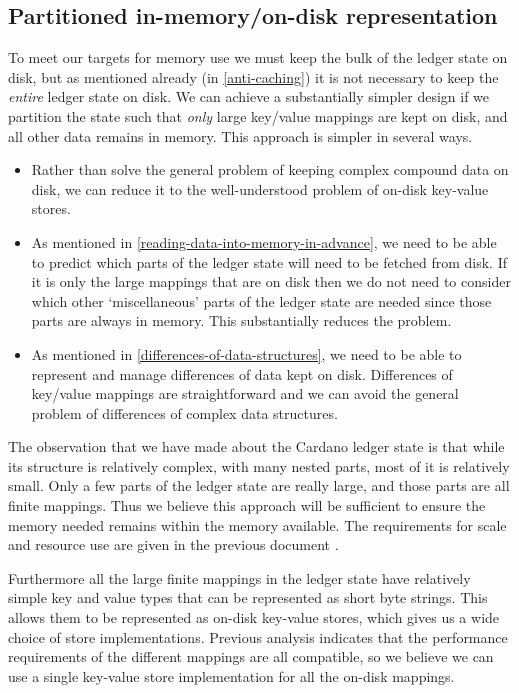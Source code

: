 \documentclass[11pt,a4paper]{article}
\begin{document}
\subsection{Partitioned in-memory/on-disk representation}
\label{partitioned-representation}

To meet our targets for memory use we must keep the bulk of the ledger state on
disk, but as mentioned already (in \cref{anti-caching}) it is not necessary to
keep the \emph{entire} ledger state on disk. We can achieve a substantially
simpler design if we partition the state such that \emph{only} large key/value
mappings are kept on disk, and all other data remains in memory. This approach
is simpler in several ways.
\begin{itemize}
\item Rather than solve the general problem of keeping complex compound data on
      disk, we can reduce it to the well-understood problem of on-disk
      key-value stores.
\item As mentioned in \cref{reading-data-into-memory-in-advance}, we need to be
      able to predict which parts of the ledger state will need to be fetched
      from disk. If it is only the large mappings that are on disk then we do
      not need to consider which other `miscellaneous' parts of the ledger
      state are needed since those parts are always in memory. This
      substantially reduces the problem.
\item As mentioned in \cref{differences-of-data-structures}, we need to be able
      to represent and manage differences of data kept on disk. Differences of
      key/value mappings are straightforward and we can avoid the general
      problem of differences of complex data structures.
\end{itemize}

The observation that we have made about the Cardano ledger state is that while
its structure is relatively complex, with many nested parts, most of it is
relatively small. Only a few parts of the ledger state are really large, and
those parts are all finite mappings. Thus we believe this approach will be
sufficient to ensure the memory needed remains within the memory available.
The requirements for scale and resource use are given in the previous document
\citep[Section 3]{utxo-db}.

Furthermore all the large finite mappings in the ledger state have relatively
simple key and value types that can be represented as short byte strings. This
allows them to be represented as on-disk key-value stores, which gives us a
wide choice of store implementations. Previous analysis \citep[Section 5]{utxo-db}
indicates that the performance requirements of the different mappings are all
compatible, so we believe we can use a single key-value store implementation
for all the on-disk mappings.
\end{document}
